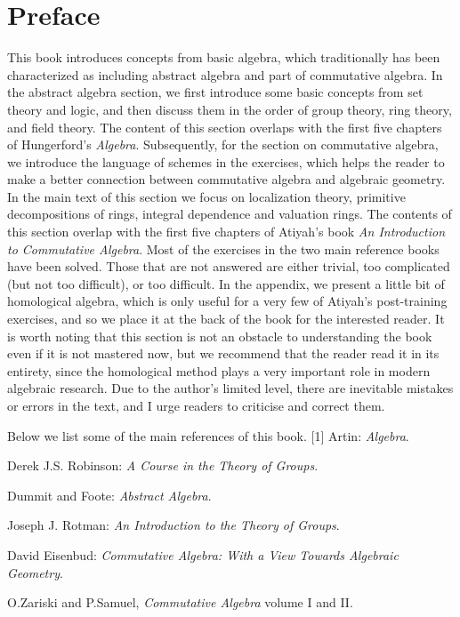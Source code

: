 \documentclass{article}
\begin{document}
\section*{Preface}
This book introduces concepts from basic algebra, which traditionally has been characterized as including abstract algebra and part of commutative algebra. In the abstract algebra section, we first introduce some basic concepts from set theory and logic, and then discuss them in the order of group theory, ring theory, and field theory. The content of this section overlaps with the first five chapters of Hungerford's \textit{Algebra}. Subsequently, for the section on commutative algebra, we introduce the language of schemes in the exercises, which helps the reader to make a better connection between commutative algebra and algebraic geometry. In the main text of this section we focus on localization theory, primitive decompositions of rings, integral dependence and valuation rings. The contents of this section overlap with the first five chapters of Atiyah's book \textit{An Introduction to Commutative Algebra}. Most of the exercises in the two main reference books have been solved. Those that are not answered are either trivial, too complicated (but not too difficult), or too difficult. In the appendix, we present a little bit of homological algebra, which is only useful for a very few of Atiyah's post-training exercises, and so we place it at the back of the book for the interested reader. It is worth noting that this section is not an obstacle to understanding the book even if it is not mastered now, but we recommend that the reader read it in its entirety, since the homological method plays a very important role in modern algebraic research. Due to the author's limited level, there are inevitable mistakes or errors in the text, and I urge readers to criticise and correct them.\par
Below we list some of the main references of this book.
[1] Artin: \textit{Algebra}.\par
[2] Derek J.S. Robinson: \textit{A Course in the Theory of Groups}.\par
[3] Dummit and Foote: \textit{Abstract Algebra}.\par
[4] Joseph J. Rotman: \textit{An Introduction to the Theory of Groups}.\par
[5] David Eisenbud: \textit{Commutative Algebra: With a View Towards Algebraic Geometry}.\par
[6] O.Zariski and P.Samuel, \textit{Commutative Algebra} volume I and II.\par
\end{document}
